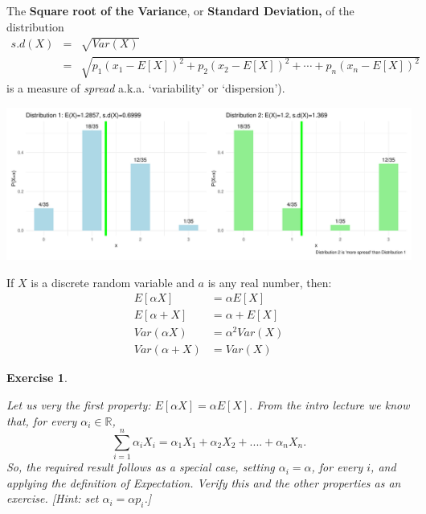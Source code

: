 \documentclass[smaller, handout]{beamer}\usepackage[]{graphicx}\usepackage[]{color}
\newenvironment{knitrout}{}{} %
\newtheorem{exercise}{Exercise}[section]
\begin{document}
\begin{frame}{\secname}
  \begin{definition}
  \begin{footnotesize}
   The \textbf{Square root of the Variance}, or \textbf{Standard
  Deviation,} of the distribution
  \begin{eqnarray*}
  s.d\left( X\right) &=&\sqrt{Var\left( X\right) } \\
  &=&\sqrt{p_{1}\left( x_{1}-E\left[ X\right] \right) ^{2}+p_{2}\left( x_{2}-E%
  \left[ X\right] \right) ^{2}+\cdots + p_{n}\left( x_{n}-E\left[ X\right]
  \right)^{2}}
  \end{eqnarray*}
  is a measure of \emph{spread} a.k.a. `variability' or `dispersion').
  \end{footnotesize}
  \end{definition}
\pause
\begin{knitrout}
\color{fgcolor}

\includegraphics[width=0.95\linewidth]{figure/unnamed-chunk-4-1} \hfill{}



\end{knitrout}
\end{frame}

\begin{frame}{\secname}%
  If $X$ is a discrete random variable and $a$ is any real number, then:
  \begin{align*}
  E\left[  \alpha X\right]  &=\alpha E\left[ X\right]\\
  E\left[  \alpha+X\right]  &=\alpha+E\left[ X\right] \\
  Var\left(\alpha X\right)  &=\alpha^{2}Var\left( X\right)\\
  Var\left( \alpha+X\right) &=Var\left( X\right)
  \end{align*}
  \pause
  \begin{exercise}
  \begin{footnotesize}
  Let us very the first property:
  $E\left[ \alpha X \right] =\alpha E\left[ X\right].$
  From the intro lecture we know that, for every $\alpha_i \in \mathbb{R}$,
  $$\sum_{i=1}^{n} \alpha_i X_{i} = \alpha_1 X_1 + \alpha_2 X_2 +....+ \alpha_n X_n.$$ So, the
  required result follows as a special case, setting $\alpha_i= \alpha$, for every $i$, and applying the definition of Expectation. Verify this and the other properties as an exercise. [Hint: set $\alpha_i = \alpha p_i$.]
  \end{footnotesize}
  \end{exercise}
\end{frame}
\end{document}
